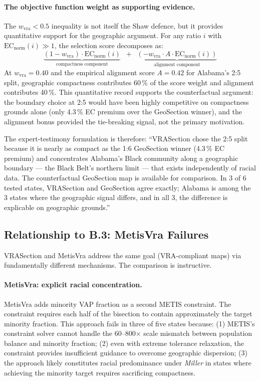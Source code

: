 \paragraph{The objective function weight as supporting evidence.}
The $w_\text{vra} < 0.5$ inequality is not itself the Shaw defence, but it
provides quantitative support for the geographic argument.
For any ratio $i$ with $\mathrm{EC}_\text{norm}(i) \gg 1$, the selection
score decomposes as:
\[
  \underbrace{(1 - w_\text{vra}) \cdot \mathrm{EC}_\text{norm}(i)}_\text{compactness component}
  \;\;+\;\;
  \underbrace{(-w_\text{vra} \cdot A \cdot \mathrm{EC}_\text{norm}(i))}_\text{alignment component}
\]
At $w_\text{vra} = 0.40$ and the empirical alignment score $A = 0.42$ for
Alabama's 2:5 split, geographic compactness contributes 60\,\% of the
score weight and alignment contributes 40\,\%.
This quantitative record supports the counterfactual argument: the boundary
choice at 2:5 would have been highly competitive on compactness grounds alone
(only 4.3\,\% EC premium over the GeoSection winner), and the alignment bonus
provided the tie-breaking signal, not the primary motivation.

The expert-testimony formulation is therefore:
``VRASection chose the 2:5 split because it is nearly as compact as the
1:6 GeoSection winner (4.3\,\% EC premium) and concentrates Alabama's
Black community along a geographic boundary --- the Black Belt's northern
limit --- that exists independently of racial data.
The counterfactual GeoSection map is available for comparison.
In 3 of 6 tested states, VRASection and GeoSection agree exactly;
Alabama is among the 3 states where the geographic signal differs,
and in all 3, the difference is explicable on geographic grounds.''

\subsection{Relationship to B.3: MetisVra Failures}

VRASection and MetisVra address the same goal (VRA-compliant maps) via
fundamentally different mechanisms.
The comparison is instructive.

\paragraph{MetisVra: explicit racial concentration.}
MetisVra adds minority VAP fraction as a second METIS constraint.
The constraint requires each half of the bisection to contain approximately
the target minority fraction.
This approach fails in three of five states because:
(1) METIS's constraint solver cannot handle the 60--800$\times$ scale
mismatch between population balance and minority fraction;
(2) even with extreme tolerance relaxation, the constraint provides
insufficient guidance to overcome geographic dispersion;
(3) the approach likely constitutes racial predominance under \emph{Miller}
in states where achieving the minority target requires sacrificing compactness.

